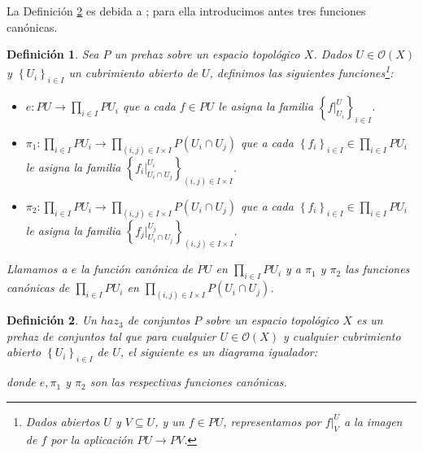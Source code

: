 \documentclass[letterpaper]{article} %
\newtheorem{Def}{Definición}
\begin{document}
   La Definición \ref{def:Moerdijk} es debida a \cite[p.~66]{SGL}; para ella introducimos antes tres funciones canónicas.

   \begin{Def} 
      Sea $P$ un prehaz sobre un espacio topológico $X$. Dados $U\in\mathcal{O}(X)$ y $\left\lbrace U_i\right\rbrace_{i\in I}$ un cubrimiento abierto de $U$, definimos las siguientes funciones\footnote{Dados abiertos $U$ y $V\subseteq U$, y un $f\in PU$, representamos por $f|^U_V$ a la imagen de $f$ por la aplicación $PU\to PV$.}:
      \begin{itemize}
         \item $e:PU\to \prod_{i\in I}PU_i$ que a cada $f\in PU$ le asigna la familia $\left\lbrace f|^{U}_{U_i}\right\rbrace_{i\in I}$.
         \item $\pi_1:\prod_{i\in I}PU_i\to \prod_{(i,j)\in I\times I}P(U_i\cap U_j)$ que a cada $\left\lbrace f_i\right\rbrace_{i\in I}\in\prod_{i\in I}PU_i$ le asigna la familia $\left\lbrace {f_i}|^{U_i}_{U_i\cap U_j}\right\rbrace_{(i,j)\in I\times I}$.
         \item $\pi_2:\prod_{i\in I}PU_i\to \prod_{(i,j)\in I\times I}P(U_i\cap U_j)$ que a cada $\left\lbrace f_i\right\rbrace_{i\in I}\in\prod_{i\in I}PU_i$ le asigna la familia $\left\lbrace {f_j}|^{U_j}_{U_i\cap U_j}\right\rbrace_{(i,j)\in I\times I}$.
      \end{itemize}
      Llamamos a $e$ la función canónica de $PU$ en $\prod_{i\in I}PU_i$ y a $\pi_1$ y $\pi_2$ las funciones canónicas de $\prod_{i\in I}PU_i$ en $\prod_{(i,j)\in I\times I}P(U_i\cap U_j)$.
   \end{Def}

   \begin{Def}\label{def:Moerdijk}
      Un ${haz}_3$ de conjuntos $P$ sobre un espacio topológico $X$ es un prehaz de conjuntos tal que para cualquier $U\in \mathcal{O}(X)$ y cualquier cubrimiento abierto $\left\lbrace U_i\right\rbrace_{i\in I}$ de $U$, el siguiente es un diagrama igualador:
      
   donde $e,\pi_1$ y $\pi_2$ son las respectivas funciones canónicas.
   \end{Def}

   \newpage
   \nocite{*}
   
   
\end{document}
